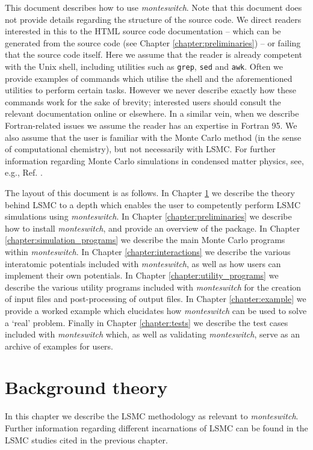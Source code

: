 \documentclass{report}
\begin{document}
This document describes how to use \emph{monteswitch}. Note that this document does not provide details regarding the structure of the source code. 
We direct readers interested in this to the HTML source code documentation -- which can be generated from the source code (see Chapter
\ref{chapter:preliminaries}) -- or failing that the source code itself. Here we assume that the reader is already competent with the Unix shell, 
including utilities such as \texttt{grep}, \texttt{sed} and \texttt{awk}. Often we provide examples of commands which utilise the shell and the 
aforementioned utilities to perform certain tasks. However we never describe exactly how these commands work for the sake of brevity; interested users
should consult the relevant documentation online or elsewhere. In a similar vein, when we describe Fortran-related issues we assume the reader has 
an expertise in Fortran 95. We also assume that the user is familiar with the Monte Carlo method (in the sense of computational
chemistry), but not necessarily with LSMC. For further information regarding Monte Carlo simulations in condensed 
matter physics, see, e.g., Ref. \cite{book:Frenkel}. 

The layout of this document is as follows. In Chapter \ref{chapter:background} we describe the theory behind LSMC to a depth which enables the user to 
competently perform LSMC simulations using \emph{monteswitch}.
In Chapter \ref{chapter:preliminaries} we describe how to install \emph{monteswitch}, and provide
an overview of the package. In Chapter \ref{chapter:simulation_programs} we describe the main Monte Carlo programs within
\emph{monteswitch}. In Chapter \ref{chapter:interactions} we describe the various interatomic potentials included with \emph{monteswitch}, as well as
how users can implement their own potentials. In Chapter \ref{chapter:utility_programs} we describe the various utility
programs included with \emph{monteswitch} for the creation of input files and post-processing of output files. In Chapter \ref{chapter:example}
we provide a worked example which elucidates how \emph{monteswitch} can be used to solve a `real' problem. Finally in Chapter \ref{chapter:tests}
we describe the test cases included with \emph{monteswitch} which, as well as validating \emph{monteswitch}, serve as an archive of examples
for users.




\chapter{Background theory}\label{chapter:background}
In this chapter we describe the LSMC methodology as relevant to \emph{monteswitch}. Further information regarding different incarnations of
LSMC can be found in the LSMC studies cited in the previous chapter.
\end{document}
